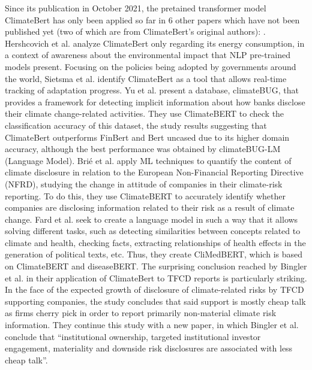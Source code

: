 \documentclass[runningheads]{llncs}
\begin{document}
Since its publication in October 2021, the pretained transformer model ClimateBert has only been applied so far in 6 other papers which have not been published yet (two of which are from ClimateBert's original authors): \cite{hershcovich2022towards,bingler2022cheapb,sietsma2022global,brie2022mandatory,fard2022climedbert,yu4308287climatebug}. Hershcovich et al. \cite{hershcovich2022towards} analyze ClimateBert only regarding its energy consumption, in a context of awareness about the environmental impact that NLP pre-trained models present. Focusing on the policies being adopted by governments around the world, Sietsma et al. \cite{sietsma2022global} identify ClimateBert as a tool that allows real-time tracking of adaptation progress. Yu et al. \cite{yu4308287climatebug} present a database, climateBUG, that provides a framework for detecting implicit information about how banks disclose their climate change-related activities. They use ClimateBERT to check the classification accuracy of this dataset, the study results suggesting that ClimateBert outperforms FinBert and Bert uncased due to its higher domain accuracy, although the best performance was obtained by climateBUG-LM (Language Model). Brié et al. \cite{brie2022mandatory} apply ML techniques to quantify the content of climate disclosure in relation to the European Non-Financial Reporting Directive (NFRD), studying the change in attitude of companies in their climate-risk reporting. To do this, they use ClimateBERT to accurately identify whether companies are disclosing information related to their risk as a result of climate change. Fard et al. \cite{fard2022climedbert} seek to create a language model in such a way that it allows solving different tasks, such as detecting similarities between concepts related to climate and health, checking facts, extracting relationships of health effects in the generation of political texts, etc. Thus, they create CliMedBERT, which is based on ClimateBERT and diseaseBERT. The surprising conclusion reached by Bingler et al. \cite{bingler2022cheapb} in their application of ClimateBert to TFCD reports is particularly striking. In the face of the expected growth of disclosure of climate-related risks by TFCD supporting companies, the study concludes that said support is mostly cheap talk as firms cherry pick in order to report primarily non-material climate risk information. They continue this study with a new paper, in which Bingler et al. \cite{bingler2022cheapb} conclude that “institutional ownership, targeted institutional investor engagement, materiality and downside risk disclosures are associated with less cheap talk”.   
\end{document}
